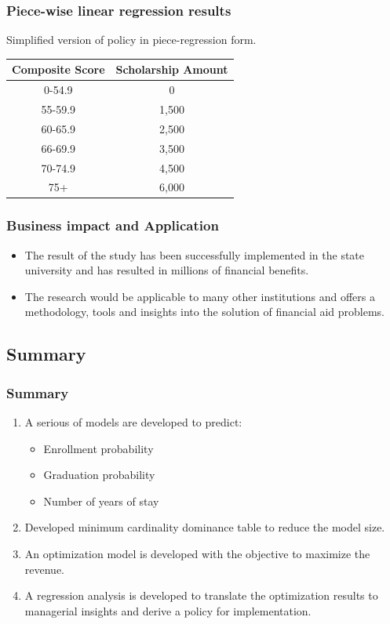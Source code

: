 \documentclass{beamer}
\begin{document}
\begin{frame}
\frametitle{Piece-wise linear regression results}
Simplified version of policy in piece-regression form.
\begin{table}[H]
\centering
\begin{tabular}{|c|c|} \hline
Composite Score & Scholarship Amount \\ \hline
0-54.9         & 0              \\ \hline
55-59.9         & 1,500              \\ \hline
60-65.9         & 2,500              \\ \hline
66-69.9         & 3,500              \\ \hline
70-74.9         & 4,500              \\ \hline
75+             & 6,000              \\ \hline
\end{tabular}
\end{table}
\end{frame}


\begin{frame}
\frametitle{Business impact and Application}
\begin{itemize}
\item  The result of the study has been successfully implemented in the 
state university and has resulted in millions of financial benefits. 
\item The research would be applicable to many other institutions and offers 
a methodology, tools and insights into the solution of financial aid 
problems. 
\end{itemize}

\end{frame}


\subsection{Summary}
\begin{frame}
\frametitle{Summary}
\begin{enumerate}
\item A serious of models are developed to predict:
  \begin{itemize}
    \item Enrollment probability
    \item Graduation probability
    \item Number of years of stay
  \end{itemize}
\item Developed minimum cardinality dominance table to reduce the model size. 
\item An optimization model is developed with the objective to maximize the revenue.
\item A regression analysis is developed to translate the optimization results to
	managerial insights and derive a policy for implementation.
\end{enumerate}
\end{frame}
\end{document}
